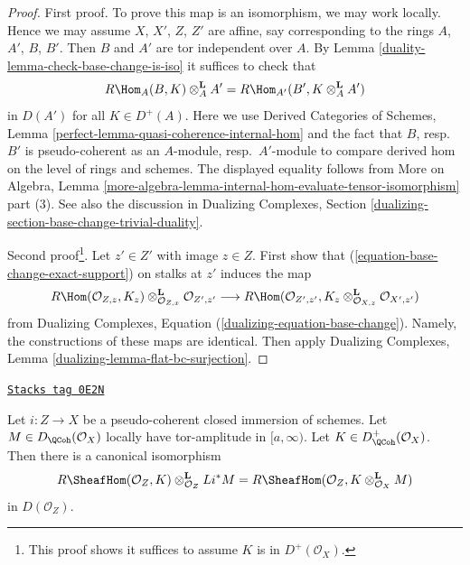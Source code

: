 \begin{proof}

First proof. To prove this map is an isomorphism, we may work locally.
Hence we may assume $X$, $X'$, $Z$, $Z'$ are affine, say corresponding
to the rings $A$, $A'$, $B$, $B'$. Then $B$ and $A'$ are tor independent
over $A$. By Lemma \ref{duality-lemma-check-base-change-is-iso} it suffices
to check that
$$
R\Hom_A(B, K) \otimes_A^\mathbf{L} A' =
R\Hom_{A'}(B', K \otimes_A^\mathbf{L} A')
$$
in $D(A')$ for all $K \in D^+(A)$. Here we use
Derived Categories of Schemes, Lemma
\ref{perfect-lemma-quasi-coherence-internal-hom}
and the fact that $B$, resp.\ $B'$ is pseudo-coherent as an
$A$-module, resp.\ $A'$-module
to compare derived hom on the level of rings and schemes.
The displayed equality follows from
More on Algebra, Lemma
\ref{more-algebra-lemma-internal-hom-evaluate-tensor-isomorphism}
part (3). See also the discussion in Dualizing Complexes, Section
\ref{dualizing-section-base-change-trivial-duality}.

\medskip\noindent
Second proof\footnote{This proof shows
it suffices to assume $K$ is in $D^+(\mathcal{O}_X)$.}.
Let $z' \in Z'$ with image $z \in Z$.
First show that (\ref{equation-base-change-exact-support})
on stalks at $z'$ induces the map
$$
R\Hom(\mathcal{O}_{Z, z}, K_z)
\otimes_{\mathcal{O}_{Z, x}}^\mathbf{L} \mathcal{O}_{Z', z'}
\longrightarrow
R\Hom(\mathcal{O}_{Z', z'},
K_z \otimes_{\mathcal{O}_{X, z}}^\mathbf{L} \mathcal{O}_{X', z'})
$$
from Dualizing Complexes, Equation (\ref{dualizing-equation-base-change}).
Namely, the constructions of these maps are identical.
Then apply Dualizing Complexes, Lemma \ref{dualizing-lemma-flat-bc-surjection}.
\end{proof}

\begin{lemma}
\label{duality-lemma-sheaf-with-exact-support-tensor}
\href{https://stacks.math.columbia.edu/tag/0E2N}{\texttt{Stacks tag 0E2N}}

Let $i : Z \to X$ be a pseudo-coherent closed immersion of schemes.
Let $M \in D_\QCoh(\mathcal{O}_X)$ locally have tor-amplitude in $[a, \infty)$.
Let $K \in D_\QCoh^+(\mathcal{O}_X)$. Then there is a canonical isomorphism
$$
R\SheafHom(\mathcal{O}_Z, K) \otimes_{\mathcal{O}_Z}^\mathbf{L} Li^*M =
R\SheafHom(\mathcal{O}_Z, K \otimes_{\mathcal{O}_X}^\mathbf{L} M)
$$
in $D(\mathcal{O}_Z)$.
\end{lemma}

